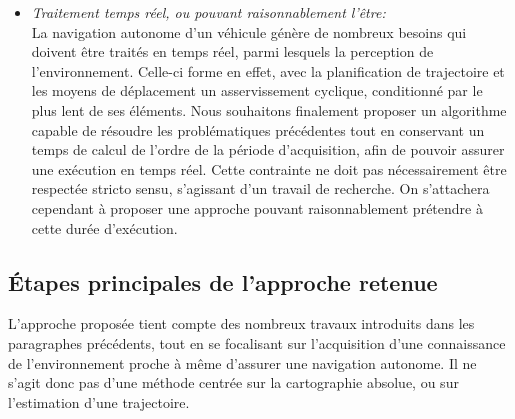 \begin{itemize}
	\item{\emph{Traitement temps réel, ou pouvant raisonnablement l'être:\\}}
	La navigation autonome d'un véhicule génère de nombreux besoins qui doivent être traités en temps réel, parmi lesquels la perception de l'environnement. Celle-ci forme en effet, avec la planification de trajectoire et les moyens de déplacement un asservissement cyclique, conditionné par le plus lent de ses éléments. Nous souhaitons finalement proposer un algorithme capable de résoudre les problématiques précédentes tout en conservant un temps de calcul de l'ordre de la période d'acquisition, afin de pouvoir assurer une exécution en temps réel. Cette contrainte ne doit pas nécessairement être respectée stricto sensu, s'agissant d'un travail de recherche. On s'attachera cependant à proposer une approche pouvant raisonnablement prétendre à cette durée d'exécution.\\
\end{itemize}

\subsection{Étapes principales de l'approche retenue}
L'approche proposée tient compte des nombreux travaux introduits dans les paragraphes précédents, tout en se focalisant sur l'acquisition d'une connaissance de l'environnement proche à même d'assurer une navigation autonome. Il ne s'agit donc pas d'une méthode centrée sur la cartographie absolue, ou sur l'estimation d'une trajectoire.\\

